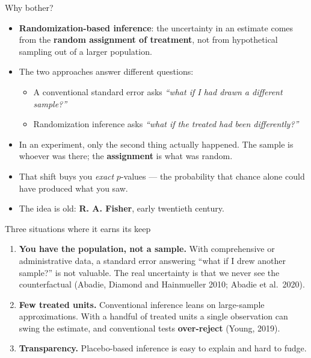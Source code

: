 \documentclass[
  11pt,
  ignorenonframetext,
  aspectratio=169,
]{beamer}
\providecommand{\tightlist}{%
  \setlength{\itemsep}{0pt}\setlength{\parskip}{0pt}}
\begin{document}
\begin{frame}{Why bother?}
\protect{}\label{why-bother}
\begin{itemize}
\tightlist
\item
  \textbf{Randomization-based inference}: the uncertainty in an estimate
  comes from the \textbf{random assignment of treatment}, not from
  hypothetical sampling out of a larger population.
\item
  The two approaches answer different questions:

  \begin{itemize}
  \tightlist
  \item
    A conventional standard error asks \emph{``what if I had drawn a
    different sample?''}
  \item
    Randomization inference asks \emph{``what if the treated had been
    differently?''}
  \end{itemize}
\item
  In an experiment, only the second thing actually happened. The sample
  is whoever was there; the \textbf{assignment} is what was random.
\item
  That shift buys you \emph{exact} \(p\)-values --- the probability that
  chance alone could have produced what you saw.
\item
  The idea is old: \textbf{R. A. Fisher}, early twentieth century.
\end{itemize}
\end{frame}

\begin{frame}{Three situations where it earns its keep}
\protect{}\label{three-situations-where-it-earns-its-keep}
\begin{enumerate}
\tightlist
\item
  \textbf{You have the population, not a sample.} With comprehensive or
  administrative data, a standard error answering ``what if I drew
  another sample?'' is not valuable. The real uncertainty is that we
  never see the counterfactual (Abadie, Diamond and Hainmueller 2010;
  Abadie et al.~2020).
\item
  \textbf{Few treated units.} Conventional inference leans on
  large-sample approximations. With a handful of treated units a single
  observation can swing the estimate, and conventional tests
  \textbf{over-reject} (Young, 2019).
\item
  \textbf{Transparency.} Placebo-based inference is easy to explain and
  hard to fudge.
\end{enumerate}

\vspace{0.4em}
\end{frame}
\end{document}
